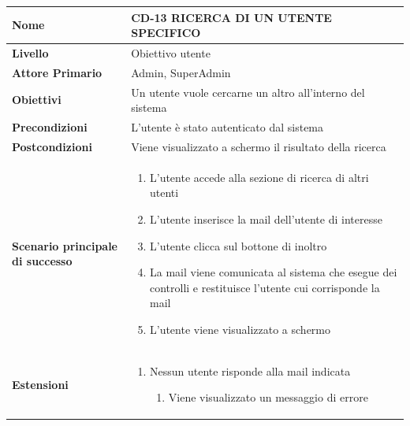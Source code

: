 \begin{center}
    \begin{tabular}{|p{0.3\linewidth}|p{0.7\linewidth}|}
    \hline
    \rowcolor{Blue}
    \textbf{Nome} & CD-13 RICERCA DI UN UTENTE SPECIFICO \\
    \hline
    \rowcolor{DarkBlue}
    \textbf{Livello} & Obiettivo utente \\
    \hline
    \rowcolor{LightBlue}
    \textbf{Attore Primario} & Admin, SuperAdmin \\
    \hline
    \rowcolor{LightBlue}
    \textbf{Obiettivi} & Un utente vuole cercarne un altro all’interno del sistema \\
    \hline
    \rowcolor{Blue}
    \textbf{Precondizioni} & L’utente è stato autenticato dal sistema \\
    \hline
    \rowcolor{LightBlue}
    \textbf{Postcondizioni} & Viene visualizzato a schermo il risultato della ricerca \\
    \hline
    \rowcolor{LighterBlue}
        \begin{center}
        \textbf{Scenario principale di successo}
    \end{center} 
    & 
    \begin{enumerate}
        \item L’utente accede alla sezione di ricerca di altri utenti
        \item L’utente inserisce la mail dell’utente di interesse
        \item L’utente clicca sul bottone di inoltro
        \item La mail viene comunicata al sistema che esegue dei controlli e restituisce l’utente cui corrisponde la mail
        \item L’utente viene visualizzato a schermo
    \end{enumerate}
    \\
    \hline
    \rowcolor{LighterBlue}
    \begin{center}
        \textbf{Estensioni}
    \end{center} 
    & 
    \begin{enumerate}
        \item Nessun utente risponde alla mail indicata
        \begin{enumerate}
            \item Viene visualizzato un messaggio di errore
        \end{enumerate}
    \end{enumerate}
    \\
    \hline
    \end{tabular}
\end{center}

